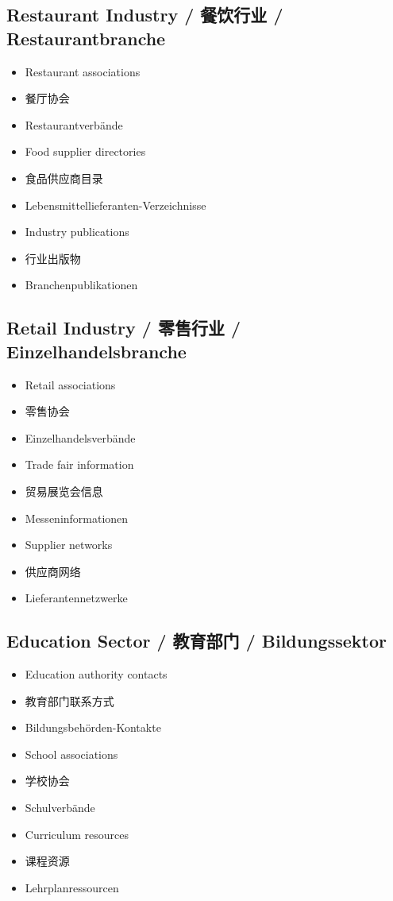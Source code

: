 \subsection{Restaurant Industry / 餐饮行业 / Restaurantbranche}
\begin{itemize}
    \item Restaurant associations
    \item 餐厅协会
    \item Restaurantverbände
    \item Food supplier directories
    \item 食品供应商目录
    \item Lebensmittellieferanten-Verzeichnisse
    \item Industry publications
    \item 行业出版物
    \item Branchenpublikationen
\end{itemize}

\subsection{Retail Industry / 零售行业 / Einzelhandelsbranche}
\begin{itemize}
    \item Retail associations
    \item 零售协会
    \item Einzelhandelsverbände
    \item Trade fair information
    \item 贸易展览会信息
    \item Messeninformationen
    \item Supplier networks
    \item 供应商网络
    \item Lieferantennetzwerke
\end{itemize}

\subsection{Education Sector / 教育部门 / Bildungssektor}
\begin{itemize}
    \item Education authority contacts
    \item 教育部门联系方式
    \item Bildungsbehörden-Kontakte
    \item School associations
    \item 学校协会
    \item Schulverbände
    \item Curriculum resources
    \item 课程资源
    \item Lehrplanressourcen
\end{itemize}

